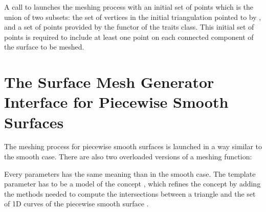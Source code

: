 A call to 
 launches 
the meshing process with an initial 
set of points which is the union of two subsets:
the set of vertices in the  initial triangulation pointed to by ,
and a set of points provided by the  functor 
of the traits class. This initial set of points is required 
to include at least one point on each connected component of the surface
to be meshed.


\section{The Surface Mesh Generator Interface for Piecewise Smooth
  Surfaces\label{SurfaceMesher_piecewise_section_interface}}

The meshing process for piecewise smooth surfaces is launched in a way
similar to the smooth case. There are also two overloaded versions of a
meshing function:





Every parameters has the same meaning than in the smooth case. The template
parameter  has to be a model of the concept
, which refines the concept
 by adding the methods needed to compute the
intersections between a triangle and the set of 1D curves of the piecewise
smooth surface .

